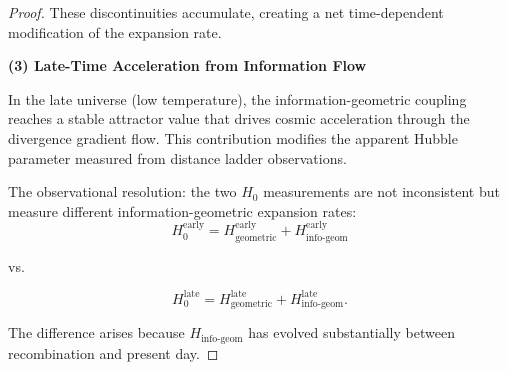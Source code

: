 \begin{theorem}
\begin{proof}
These discontinuities accumulate, creating a net time-dependent modification of the expansion rate.

\textbf{(3) Late-Time Acceleration from Information Flow}

In the late universe (low temperature), the information-geometric coupling reaches a stable attractor value that drives cosmic acceleration through the divergence gradient flow. This contribution modifies the apparent Hubble parameter measured from distance ladder observations.

The observational resolution: the two $H_0$ measurements are not inconsistent but measure different information-geometric expansion rates:
\begin{equation}
H_0^{\text{early}} = H_{\text{geometric}}^{\text{early}} + H_{\text{info-geom}}^{\text{early}}
\end{equation}

vs.

\begin{equation}
H_0^{\text{late}} = H_{\text{geometric}}^{\text{late}} + H_{\text{info-geom}}^{\text{late}}.
\end{equation}

The difference arises because $H_{\text{info-geom}}$ has evolved substantially between recombination and present day.

\end{proof}

\end{theorem}

